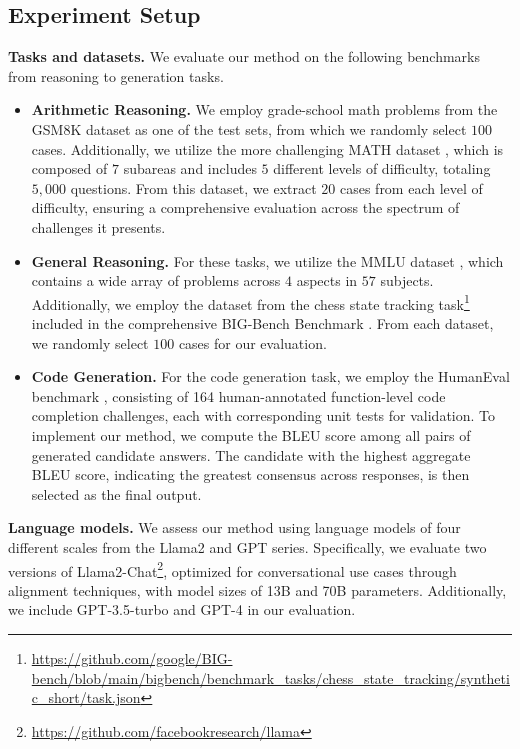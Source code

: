\subsection{Experiment Setup}
\textbf{Tasks and datasets.} We evaluate our method on the following benchmarks from reasoning to generation tasks.
\begin{itemize}
    \item \textbf{Arithmetic Reasoning.} We employ grade-school math problems from the GSM8K dataset \cite{gsm} as one of the test sets, from which we randomly select $100$ cases. Additionally, we utilize the more challenging MATH dataset \cite{math}, which is composed of $7$ subareas and includes $5$ different levels of difficulty, totaling $5,000$ questions. From this dataset, we extract $20$ cases from each level of difficulty, ensuring a comprehensive evaluation across the spectrum of challenges it presents.
    \item \textbf{General Reasoning.} For these tasks, we utilize the MMLU dataset \cite{mmlu}, which contains a wide array of problems across $4$ aspects in $57$ subjects. Additionally, we employ the dataset from the chess state tracking task\footnote{\url{https://github.com/google/BIG-bench/blob/main/bigbench/benchmark_tasks/chess_state_tracking/synthetic_short/task.json}} included in the comprehensive BIG-Bench Benchmark \cite{bbb}. From each dataset, we randomly select $100$ cases for our evaluation.
    \item \textbf{Code Generation.} For the code generation task, we employ the HumanEval benchmark \cite{humaneval}, consisting of 164 human-annotated function-level code completion challenges, each with corresponding unit tests for validation. To implement our method, we compute the BLEU score \cite{bleu} among all pairs of generated candidate answers. The candidate with the highest aggregate BLEU score, indicating the greatest consensus across responses, is then selected as the final output.
\end{itemize}

\textbf{Language models.} We assess our method using language models of four different scales from the Llama2 \cite{llama2} and GPT series. Specifically, we evaluate two versions of Llama2-Chat\footnote{\url{https://github.com/facebookresearch/llama}}, optimized for conversational use cases through alignment techniques, with model sizes of 13B and 70B parameters. Additionally, we include GPT-3.5-turbo and GPT-4 in our evaluation.

